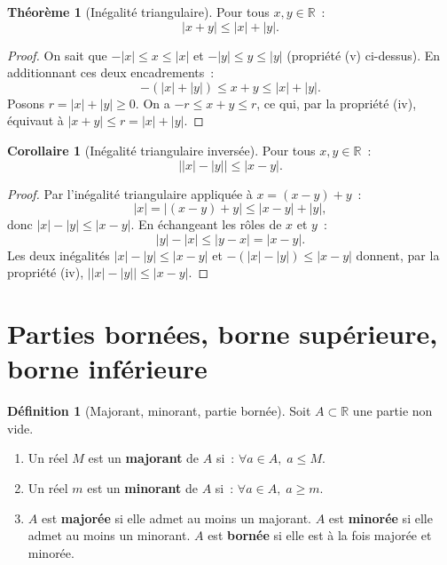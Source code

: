 \documentclass[12pt,a4paper,openany]{book}
\theoremstyle{definition}
\newtheorem{definition}{Définition}[chapter]
\newtheorem{theoreme}{Théorème}[chapter]
\newtheorem{corollaire}{Corollaire}[chapter]
\newcommand{\R}{\mathbb{R}}
\newcommand{\abs}[1]{\left\lvert #1 \right\rvert}
\begin{document}
\begin{theoreme}[Inégalité triangulaire]\label{thm:ineg-triang}
  Pour tous $x, y \in \R$~:
  \[
    \abs{x + y} \leq \abs{x} + \abs{y}.
  \]
\end{theoreme}

\begin{proof}
  On sait que $-\abs{x} \leq x \leq \abs{x}$ et $-\abs{y} \leq y \leq \abs{y}$ (propriété (v) ci-dessus). En additionnant ces deux encadrements~:
  \[
    -(\abs{x} + \abs{y}) \leq x + y \leq \abs{x} + \abs{y}.
  \]
  Posons $r = \abs{x} + \abs{y} \geq 0$. On a $-r \leq x+y \leq r$, ce qui, par la propriété (iv), équivaut à $\abs{x+y} \leq r = \abs{x} + \abs{y}$.
\end{proof}

\begin{corollaire}[Inégalité triangulaire inversée]\label{cor:ineg-triang-inv}
  Pour tous $x, y \in \R$~:
  \[
    \bigl|\abs{x} - \abs{y}\bigr| \leq \abs{x - y}.
  \]
\end{corollaire}

\begin{proof}
  Par l'inégalité triangulaire appliquée à $x = (x-y) + y$~:
  \[
    \abs{x} = \abs{(x-y) + y} \leq \abs{x-y} + \abs{y},
  \]
  donc $\abs{x} - \abs{y} \leq \abs{x-y}$. En échangeant les rôles de $x$ et $y$~:
  \[
    \abs{y} - \abs{x} \leq \abs{y-x} = \abs{x-y}.
  \]
  Les deux inégalités $\abs{x} - \abs{y} \leq \abs{x-y}$ et $-(\abs{x} - \abs{y}) \leq \abs{x-y}$ donnent, par la propriété (iv), $\bigl|\abs{x} - \abs{y}\bigr| \leq \abs{x-y}$.
\end{proof}


\section{Parties bornées, borne supérieure, borne inférieure}
\label{sec:bornes}

\begin{definition}[Majorant, minorant, partie bornée]\label{def:majorant-minorant}
  Soit $A \subset \R$ une partie non vide.
  \begin{enumerate}[label=(\roman*)]
    \item Un réel $M$ est un \textbf{majorant} de $A$ si~: $\forall a \in A,\; a \leq M$.
    \item Un réel $m$ est un \textbf{minorant} de $A$ si~: $\forall a \in A,\; a \geq m$.
    \item $A$ est \textbf{majorée} si elle admet au moins un majorant. $A$ est \textbf{minorée} si elle admet au moins un minorant. $A$ est \textbf{bornée} si elle est à la fois majorée et minorée.
  \end{enumerate}
\end{definition}
\end{document}
